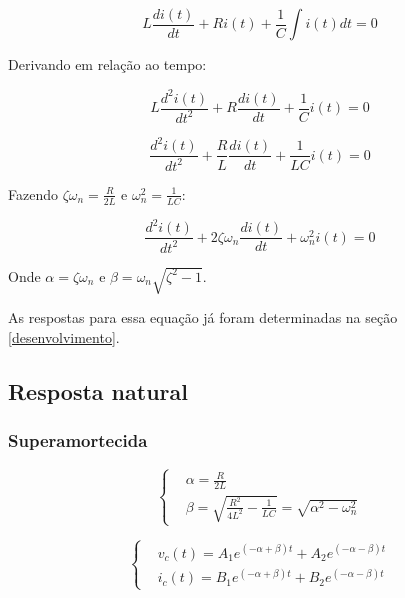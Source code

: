 \documentclass[12pt,fleqn]{book} %
\begin{document}
{\begin{equation}
L\frac{di(t)}{dt} + Ri(t) + \frac{1}{C}\int i(t)dt = 0
\end{equation}

Derivando em relação ao tempo:

\begin{equation}
L\frac{d^2i(t)}{dt^2} + R\frac{di(t)}{dt} + \frac{1}{C}i(t) = 0
\end{equation}

\begin{equation}
\frac{d^2i(t)}{dt^2} + \frac{R}{L}\frac{di(t)}{dt} + \frac{1}{LC}i(t) = 0
\end{equation}

Fazendo $\zeta\omega_n = \frac{R}{2L}$ e $\omega_n^2 = \frac{1}{LC}$:

\begin{equation}
\frac{d^2i(t)}{dt^2} + 2\zeta\omega_n\frac{di(t)}{dt} + \omega_n^2i(t) = 0
\end{equation}

Onde $\alpha = \zeta\omega_n$ e $\beta = \omega_n\sqrt{\zeta^2-1}$.

As respostas para essa equação já foram determinadas na seção \ref{desenvolvimento}.

    
        \subsection{Resposta natural}
            
            \subsubsection{Superamortecida}
            

\begin{equation}
\left\{\begin{aligned} & 
        \alpha = \frac{R}{2L}\\&         
        \beta = \sqrt{\frac{R^2}{4L^2}-\frac{1}{LC}} = \sqrt{\alpha^2-\omega_n^2}
    \end{aligned}\right.
\end{equation}
            
\begin{equation}
\left\{\begin{aligned} & 
        v_c(t) = A_1e^{(-\alpha + \beta)t} + A_2e^{(-\alpha - \beta)t} \\&       
        i_c(t) = B_1e^{(-\alpha + \beta)t} + B_2e^{(-\alpha - \beta)t} 
    \end{aligned}\right.
\end{equation}

}
\end{document}
